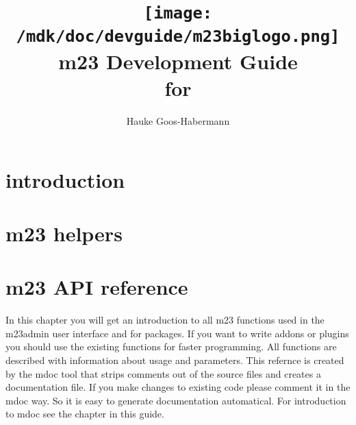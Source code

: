 \documentclass[10pt,a4paper,titlepage]{book}
\author{Hauke Goos-Habermann}
\title{\texttt{[image: /mdk/doc/devguide/m23biglogo.png]}\\m23 Development Guide\\for }
\begin{document}
\maketitle
\tableofcontents
\newpage

\chapter{introduction}




% 

% 

% 
% 
% 
% 
% 
% 
% 
% 
% 

\chapter{m23 helpers}




\chapter{m23 API reference}
In this chapter you will get an introduction to all m23 functions used in the m23admin user interface and for packages. If you want to write addons or plugins you should use the existing functions for faster programming. All functions are described with information about usage and parameters. This refernce is created by the mdoc tool that strips comments out of the source files and creates a documentation file. If you make changes to existing code please comment it in the mdoc way. So it is easy to generate documentation automatical. For introduction to mdoc see the chapter in this guide.

\end{document}
